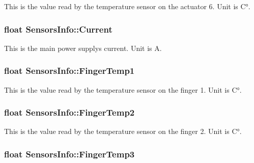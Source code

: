 This is the value read by the temperature sensor on the actuator 6. Unit is C°. 

\subsubsection[{\texorpdfstring{Current}{Current}}]{\setlength{\rightskip}{0pt plus 5cm}float Sensors\+Info\+::\+Current}\hypertarget{struct_sensors_info_a2be7e431dce5a2093e6f61a7333b574c}{}\label{struct_sensors_info_a2be7e431dce5a2093e6f61a7333b574c}


This is the main power supply\textquotesingle{}s current. Unit is A. 

\subsubsection[{\texorpdfstring{Finger\+Temp1}{FingerTemp1}}]{\setlength{\rightskip}{0pt plus 5cm}float Sensors\+Info\+::\+Finger\+Temp1}\hypertarget{struct_sensors_info_a752833e7fba2c791ecf2693b96cff3d0}{}\label{struct_sensors_info_a752833e7fba2c791ecf2693b96cff3d0}


This is the value read by the temperature sensor on the finger 1. Unit is C°. 

\subsubsection[{\texorpdfstring{Finger\+Temp2}{FingerTemp2}}]{\setlength{\rightskip}{0pt plus 5cm}float Sensors\+Info\+::\+Finger\+Temp2}\hypertarget{struct_sensors_info_a97f570d85f99948f785551712da25145}{}\label{struct_sensors_info_a97f570d85f99948f785551712da25145}


This is the value read by the temperature sensor on the finger 2. Unit is C°. 

\subsubsection[{\texorpdfstring{Finger\+Temp3}{FingerTemp3}}]{\setlength{\rightskip}{0pt plus 5cm}float Sensors\+Info\+::\+Finger\+Temp3}\hypertarget{struct_sensors_info_ad18fa2c352189db0a8aff1d38c1c7b52}{}\label{struct_sensors_info_ad18fa2c352189db0a8aff1d38c1c7b52}


